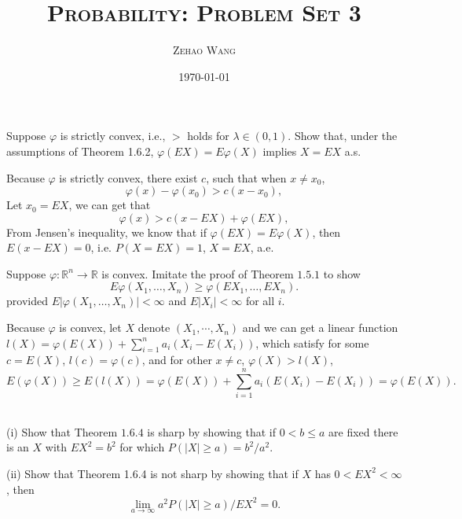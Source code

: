 \documentclass[en, normal, 11pt, black]{elegantnote}
\title{\textsc{Probability: Problem Set 3}}
\author{\textsc{Zehao Wang}}
\date{\today}
\newenvironment{exercise}[1]{\begin{tcolorbox}[colback=black!15, colframe=black!80, breakable, title=#1]}{\end{tcolorbox}}
\renewenvironment{proof}{\begin{tcolorbox}[colback=white, colframe=black!50, breakable, title=Proof. ]\setlength{\parskip}{0.8em}}{\,\\\rightline{$\square$}\end{tcolorbox}}
\begin{document}
    \maketitle
    \begin{exercise}{1.6.1}
        Suppose $\varphi$ is strictly convex, i.e., $>$ holds for $\lambda \in(0,1)$. Show that, under the assumptions of Theorem 1.6.2, $\varphi(E X)=E \varphi(X)$ implies $X=E X$ a.s. 
    \end{exercise}

    \begin{proof}
        Because $\varphi$ is strictly convex, there exist $c$, such that when $x\not=x_0$, 
        \[
            \varphi(x)-\varphi(x_0)>c(x-x_0), 
        \]
        Let $x_0=EX$, we can get that 
        \[
            \varphi(x)>c(x-EX)+\varphi(EX), 
        \]
        From Jensen's inequality, we know that if $\varphi(EX)=E\varphi(X)$, then $E(x-EX)=0$, i.e. $P(X=EX)=1$, $X=EX$, a.e. 
    \end{proof}


    \begin{exercise}{1.6.2}
        Suppose $\varphi: \mathbb{R}^{n} \rightarrow \mathbb{R}$ is convex. Imitate the proof of Theorem $1.5.1$ to show
        \[
            E \varphi\left(X_{1}, \ldots, X_{n}\right) \geq \varphi\left(E X_{1}, \ldots, E X_{n}\right). 
        \]
        provided $E\left|\varphi\left(X_{1}, \ldots, X_{n}\right)\right|<\infty$ and $E\left|X_{i}\right|<\infty$ for all $i$. 
    \end{exercise}

    \begin{proof}
        Because $\varphi$ is convex, let $X$ denote $(X_1, \cdots, X_n)$ and we can get a linear function $l(X)=\varphi(E(X))+\sum_{i=1}^na_i(X_i-E(X_i))$, which satisfy for some $c=E(X)$, $l(c)=\varphi(c)$, and for other $x\not=c$, $\varphi(X)>l(X)$, 
        \[
            E(\varphi(X))\geqslant E\left(l(X)\right)=\varphi(E(X))+\sum_{i=1}^na_i(E(X_i)-E(X_i))=\varphi(E(X)). 
        \]
        \vspace{-30pt}
    \end{proof}


    \begin{exercise}{1.6.3. Chebyshev's inequality is and is not sharp.}        
        (i) Show that Theorem $1.6.4$ is sharp by showing that if $0<b \leq a$ are fixed there is an $X$ with $E X^{2}=b^{2}$ for which $P(|X| \geq a)=b^{2} / a^{2}$. 
        
        (ii) Show that Theorem 1.6.4 is not sharp by showing that if $X$ has $0<E X^{2}<\infty$, then
        \[
            \lim _{a \rightarrow \infty} a^{2} P(|X| \geq a) / E X^{2}=0. 
        \]
    \end{exercise}
\end{document}
